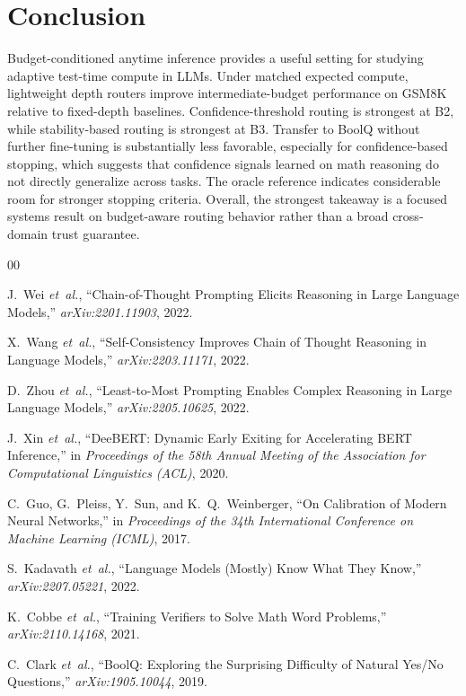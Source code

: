 \documentclass[conference]{IEEEtran}
\begin{document}
\section{Conclusion}
Budget-conditioned anytime inference provides a useful setting for studying adaptive test-time compute in LLMs. Under matched expected compute, lightweight depth routers improve intermediate-budget performance on GSM8K relative to fixed-depth baselines. Confidence-threshold routing is strongest at B2, while stability-based routing is strongest at B3. Transfer to BoolQ without further fine-tuning is substantially less favorable, especially for confidence-based stopping, which suggests that confidence signals learned on math reasoning do not directly generalize across tasks. The oracle reference indicates considerable room for stronger stopping criteria. Overall, the strongest takeaway is a focused systems result on budget-aware routing behavior rather than a broad cross-domain trust guarantee.

\begin{thebibliography}{00}

J.~Wei \emph{et~al.}, ``Chain-of-Thought Prompting Elicits Reasoning in Large Language Models,'' \emph{arXiv:2201.11903}, 2022.

X.~Wang \emph{et~al.}, ``Self-Consistency Improves Chain of Thought Reasoning in Language Models,'' \emph{arXiv:2203.11171}, 2022.

D.~Zhou \emph{et~al.}, ``Least-to-Most Prompting Enables Complex Reasoning in Large Language Models,'' \emph{arXiv:2205.10625}, 2022.

J.~Xin \emph{et~al.}, ``DeeBERT: Dynamic Early Exiting for Accelerating BERT Inference,'' in \emph{Proceedings of the 58th Annual Meeting of the Association for Computational Linguistics (ACL)}, 2020.

C.~Guo, G.~Pleiss, Y.~Sun, and K.~Q.~Weinberger, ``On Calibration of Modern Neural Networks,'' in \emph{Proceedings of the 34th International Conference on Machine Learning (ICML)}, 2017.

S.~Kadavath \emph{et~al.}, ``Language Models (Mostly) Know What They Know,'' \emph{arXiv:2207.05221}, 2022.

K.~Cobbe \emph{et~al.}, ``Training Verifiers to Solve Math Word Problems,'' \emph{arXiv:2110.14168}, 2021.

C.~Clark \emph{et~al.}, ``BoolQ: Exploring the Surprising Difficulty of Natural Yes/No Questions,'' \emph{arXiv:1905.10044}, 2019.

\end{thebibliography}
\end{document}
